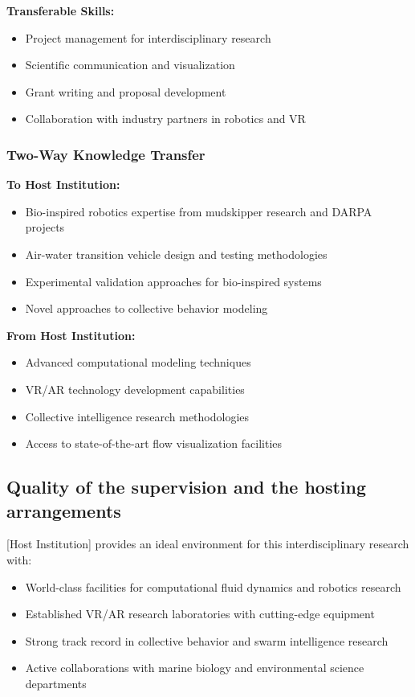 \documentclass[11pt,a4paper]{article}
\newcommand{\highlight}[1]{\textbf{\color{blue!70!black} #1}}
\begin{document}
\highlight{Transferable Skills:}
\begin{itemize}[noitemsep]
\item Project management for interdisciplinary research
\item Scientific communication and visualization
\item Grant writing and proposal development
\item Collaboration with industry partners in robotics and VR
\end{itemize}

\subsubsection{Two-Way Knowledge Transfer}

\highlight{To Host Institution:}
\begin{itemize}[noitemsep]
\item Bio-inspired robotics expertise from mudskipper research and DARPA projects
\item Air-water transition vehicle design and testing methodologies  
\item Experimental validation approaches for bio-inspired systems
\item Novel approaches to collective behavior modeling
\end{itemize}

\highlight{From Host Institution:}
\begin{itemize}[noitemsep]
\item Advanced computational modeling techniques
\item VR/AR technology development capabilities
\item Collective intelligence research methodologies
\item Access to state-of-the-art flow visualization facilities
\end{itemize}

\subsection{Quality of the supervision and the hosting arrangements}

[Host Institution] provides an ideal environment for this interdisciplinary research with:
\begin{itemize}[noitemsep]
\item World-class facilities for computational fluid dynamics and robotics research
\item Established VR/AR research laboratories with cutting-edge equipment
\item Strong track record in collective behavior and swarm intelligence research
\item Active collaborations with marine biology and environmental science departments
\end{itemize}
\end{document}
